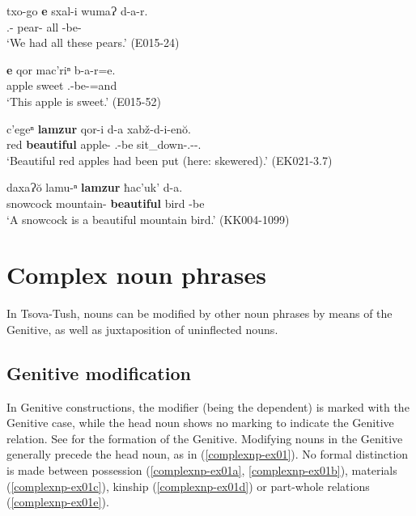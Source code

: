\begin{exe}
	\ex\label{simplenp-ex12}
	\begin{xlist}
		\ex\label{simplenp-ex12a}
		\gll txo-go \textbf{e} sxal-i wumaɁ d-a-r. \\
		{\Fpl}.{\Excl}-{\Adess} \textbf{{\Prox}} pear-{\Pl} all {\D}-be-{{\Imprf}} \\
		\trans `We had all these pears.'
		\hfill (E015-24)
		
		\ex\label{simplenp-ex12b}
		\gll \textbf{e} qor mac'riⁿ b-a-r=e. \\
		\textbf{{\Prox}} apple sweet {\B}.{\Sg}-be-{{\Imprf}}=and \\
		\trans `This apple is sweet.'
		\hfill (E015-52)
		
		\ex\label{simplenp-ex12c}
		\gll c'egeⁿ \textbf{lamzur} qor-i d-a xabž-d-i-en\u{o}. \\
		red \textbf{beautiful} apple-{\Pl} {\B}.{\Pl}-be sit\_down-{\B}.{\Pl}-{\Tr}-{\Ptcp}.{\Aor} \\
		\trans `Beautiful red apples had been put (here: skewered).'
		\hfill (EK021-3.7)
		
		\ex\label{simplenp-ex12d}
		\gll daxaɁ\u{o} lamu-ⁿ \textbf{lamzur} ħac'uk' d-a. \\
		snowcock mountain-{\Gen} \textbf{beautiful} bird {\D}-be \\
		\trans `A snowcock is a beautiful mountain bird.'
		\hfill (KK004-1099)
		
	\end{xlist}
\end{exe}




\section{Complex noun phrases} \label{complexnp}

In Tsova-Tush, nouns can be modified by other noun phrases by means of the Genitive, as well as juxtaposition of uninflected nouns.


\subsection{Genitive modification} \label{Genitive}

In Genitive constructions, the modifier (being the dependent) is marked with the Genitive case, while the head noun shows no marking to indicate the Genitive relation. See  for the formation of the Genitive. Modifying nouns in the Genitive generally precede the head noun, as in (\ref{complexnp-ex01}). No formal distinction is made between possession (\ref{complexnp-ex01a}, \ref{complexnp-ex01b}), materials (\ref{complexnp-ex01c}), kinship (\ref{complexnp-ex01d}) or part-whole relations (\ref{complexnp-ex01e}).

